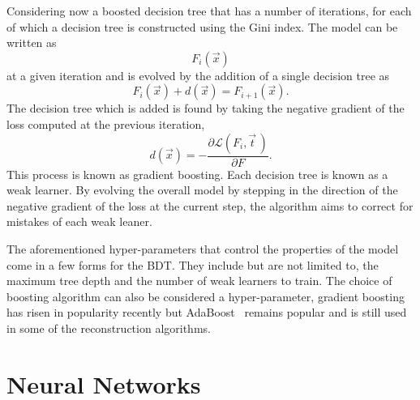 Considering now a boosted decision tree that has a number of iterations, for each
of which a decision tree is constructed using the Gini index. The model can be
written as
\begin{equation}
  F_i(\vec{x})
\end{equation}
at a given iteration and is evolved by the addition of a single decision tree as
\begin{equation}
  F_i({\vec{x}}) + d(\vec{x}) = F_{i+1}(\vec{x}).
\end{equation}
The decision tree which is added is found by taking the negative gradient of the
loss computed at the previous iteration,
\begin{equation}
  d(\vec{x}) = - \frac{\partial \mathcal{L}(F_i, \vec{t} \,)}{\partial F}.
\end{equation}
This process is known as gradient boosting. Each decision tree is known as a
weak learner. By evolving the overall model by stepping in the direction of the
negative gradient of the loss at the current step, the algorithm aims to correct
for mistakes of each weak leaner.

The aforementioned hyper-parameters that control the properties of the model
come in a few forms for the BDT. They include but are not limited to, the
maximum tree depth and the number of weak learners to train. The choice of
boosting algorithm can also be considered a hyper-parameter, gradient boosting
has risen in popularity recently but AdaBoost~\cite{AdaBoost} remains popular
and is still used in some of the reconstruction algorithms.

\section{Neural Networks}%

\label{sec:neural-networks}

